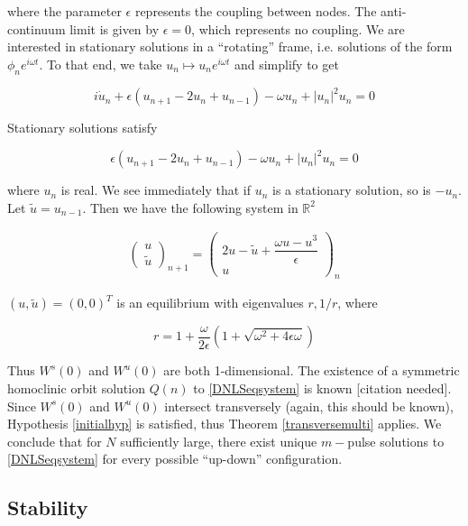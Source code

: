 \documentclass[12pt]{article}
\def\R{{\mathbb R}}
\begin{document}
where the parameter $\epsilon$ represents the coupling between nodes. The anti-continuum limit is given by $\epsilon = 0$, which represents no coupling. We are interested in stationary solutions in a ``rotating'' frame, i.e. solutions of the form $\phi_n e^{i \omega t}$. To that end, we take $u_n \mapsto u_n e^{i \omega t}$ and simplify to get

\begin{equation}\label{dNLSomega}
i\dot{u}_n + \epsilon(u_{n+1} - 2 u_n + u_{n-1}) - \omega u_n + |u_n|^2 u_n = 0
\end{equation}

Stationary solutions satisfy

\begin{equation}
\epsilon(u_{n+1} - 2 u_n + u_{n-1}) - \omega u_n + |u_n|^2 u_n = 0
\end{equation}

where $u_n$ is real. We see immediately that if $u_n$ is a stationary solution, so is $-u_n$. Let $\tilde{u} = u_{n-1}$. Then we have the following system in $\R^2$

\begin{align}\label{DNLSeqsystem}
\begin{pmatrix}u \\ \tilde{u} \end{pmatrix}_{n+1} =
\begin{pmatrix}2 u - \tilde{u} + \dfrac{\omega u - u^3}{\epsilon} \\ u \end{pmatrix}_n
\end{align}

$(u, \tilde{u}) = (0, 0)^T$ is an equilibrium with eigenvalues $r, 1/r$, where

\[
r = 1 + \frac{\omega}{2 \epsilon}\left( 1 + \sqrt{\omega^2 + 4 \epsilon \omega } \right)
\]

Thus $W^s(0)$ and $W^u(0)$ are both 1-dimensional. The existence of a symmetric homoclinic orbit solution $Q(n)$ to \eqref{DNLSeqsystem} is known [citation needed]. Since $W^s(0)$ and $W^u(0)$ intersect transversely (again, this should be known), Hypothesis \ref{initialhyp} is satisfied, thus Theorem \ref{transversemulti} applies. We conclude that for $N$ sufficiently large, there exist unique $m-$pulse solutions to \eqref{DNLSeqsystem} for every possible ``up-down'' configuration.


\subsection{Stability}
\end{document}
